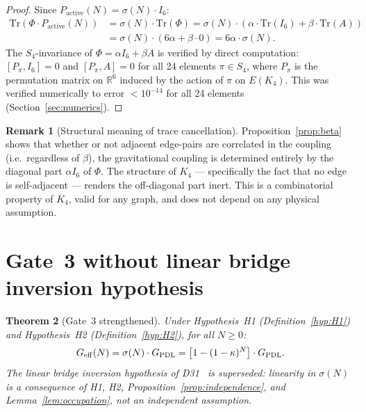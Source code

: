 \documentclass[11pt,a4paper]{article}
\newtheorem{theorem}{Theorem}[section]
\theoremstyle{definition}
\newtheorem{remark}[theorem]{Remark}
\newcommand{\PDL}{\textnormal{PDL}}
\newcommand{\GPDL}{G_{\PDL}}
\newcommand{\Geff}{G_{\mathrm{eff}}}
\newcommand{\sig}{\sigma}
\newcommand{\kap}{\kappa}
\newcommand{\Kfour}{K_4}
\begin{document}
\begin{proof}
Since $P_{\mathrm{active}}(N) = \sig(N)\cdot I_6$:
\begin{align}
\mathrm{Tr}(\Phi\cdot P_{\mathrm{active}}(N)) &= \sig(N)\cdot\mathrm{Tr}(\Phi) = \sig(N)\cdot(\alpha\cdot\mathrm{Tr}(I_6) + \beta\cdot\mathrm{Tr}(A)) \nonumber\\
&= \sig(N)\cdot(6\alpha + \beta\cdot 0) = 6\alpha\cdot\sig(N). \label{eq:trace_computation}
\end{align}
The $S_4$-invariance of $\Phi = \alpha I_6 + \beta A$ is verified by direct computation: $[P_\pi, I_6] = 0$ and $[P_\pi, A] = 0$ for all 24 elements $\pi\in S_4$, where $P_\pi$ is the permutation matrix on $\mathbb{R}^6$ induced by the action of $\pi$ on $E(\Kfour)$. This was verified numerically to error $<10^{-14}$ for all 24 elements (Section~\ref{sec:numerics}).
\end{proof}

\begin{remark}[Structural meaning of trace cancellation]
\label{rem:trace_meaning}
Proposition~\ref{prop:beta} shows that whether or not adjacent edge-pairs are correlated in the coupling (i.e.\ regardless of $\beta$), the gravitational coupling is determined entirely by the diagonal part $\alpha I_6$ of $\Phi$. The structure of $\Kfour$ --- specifically the fact that no edge is self-adjacent --- renders the off-diagonal part inert. This is a combinatorial property of $\Kfour$, valid for any graph, and does not depend on any physical assumption.
\end{remark}

\section{Gate~3 without linear bridge inversion hypothesis}
\label{sec:theorem}

\begin{theorem}[Gate~3 strengthened]
\label{thm:gate3}
Under Hypothesis~H1 (Definition~\ref{hyp:H1}) and Hypothesis~H2 (Definition~\ref{hyp:H2}), for all $N\geq 0$:
\begin{equation}
\Geff(N) = \sig(N)\cdot\GPDL = \bigl[1-(1-\kap)^N\bigr]\cdot\GPDL. \label{eq:gate3}
\end{equation}
The linear bridge inversion hypothesis of D31~\cite{PDL_D31_2026} is superseded: linearity in $\sig(N)$ is a consequence of H1, H2, Proposition~\ref{prop:independence}, and Lemma~\ref{lem:occupation}, not an independent assumption.
\end{theorem}
\end{document}
